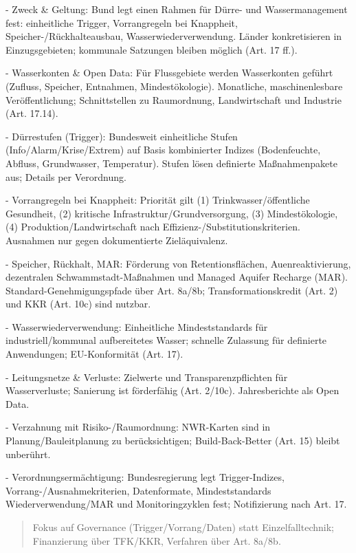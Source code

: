 \documentclass[12pt,a4paper]{scrartcl}
\begin{document}
- Zweck \& Geltung: Bund legt einen Rahmen für Dürre- und Wassermanagement fest: einheitliche Trigger, Vorrangregeln bei Knappheit, Speicher-/Rückhalteausbau, Wasserwiederverwendung. Länder konkretisieren in Einzugsgebieten; kommunale Satzungen bleiben möglich (Art. 17 ff.).

- Wasserkonten \& Open Data: Für Flussgebiete werden Wasserkonten geführt (Zufluss, Speicher, Entnahmen, Mindestökologie). Monatliche, maschinenlesbare Veröffentlichung; Schnittstellen zu Raumordnung, Landwirtschaft und Industrie (Art. 17.14).

- Dürrestufen (Trigger): Bundesweit einheitliche Stufen (Info/Alarm/Krise/Extrem) auf Basis kombinierter Indizes (Bodenfeuchte, Abfluss, Grundwasser, Temperatur). Stufen lösen definierte Maßnahmenpakete aus; Details per Verordnung.

- Vorrangregeln bei Knappheit: Priorität gilt (1) Trinkwasser/öffentliche Gesundheit, (2) kritische Infrastruktur/Grundversorgung, (3) Mindestökologie, (4) Produktion/Landwirtschaft nach Effizienz-/Substitutionskriterien. Ausnahmen nur gegen dokumentierte Zieläquivalenz.

- Speicher, Rückhalt, MAR: Förderung von Retentionsflächen, Auenreaktivierung, dezentralen Schwammstadt-Maßnahmen und Managed Aquifer Recharge (MAR). Standard-Genehmigungspfade über Art. 8a/8b; Transformationskredit (Art. 2) und KKR (Art. 10c) sind nutzbar.

- Wasserwiederverwendung: Einheitliche Mindeststandards für industriell/kommunal aufbereitetes Wasser; schnelle Zulassung für definierte Anwendungen; EU-Konformität (Art. 17).

- Leitungsnetze \& Verluste: Zielwerte und Transparenzpflichten für Wasserverluste; Sanierung ist förderfähig (Art. 2/10c). Jahresberichte als Open Data.

- Verzahnung mit Risiko-/Raumordnung: NWR-Karten sind in Planung/Bauleitplanung zu berücksichtigen; Build-Back-Better (Art. 15) bleibt unberührt.

- Verordnungsermächtigung: Bundesregierung legt Trigger-Indizes, Vorrang-/Ausnahmekriterien, Datenformate, Mindeststandards Wiederverwendung/MAR und Monitoringzyklen fest; Notifizierung nach Art. 17.

{\footnotesize\begin{quote}
Fokus auf Governance (Trigger/Vorrang/Daten) statt Einzelfalltechnik; Finanzierung über TFK/KKR, Verfahren über Art. 8a/8b.
\end{quote}}
\end{document}
